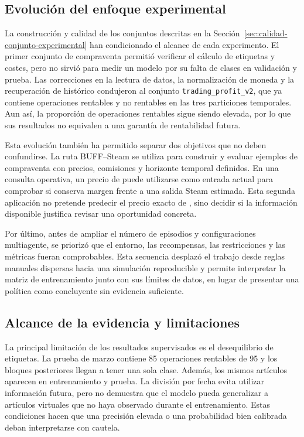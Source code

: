 \subsection{Evolución del enfoque experimental}

La construcción y calidad de los conjuntos descritas en la Sección~\ref{sec:calidad-conjunto-experimental} han condicionado el alcance de cada experimento. El primer conjunto de compraventa permitió verificar el cálculo de etiquetas y costes, pero no sirvió para medir un modelo por su falta de clases en validación y prueba. Las correcciones en la lectura de datos, la normalización de moneda y la recuperación de histórico condujeron al conjunto \texttt{trading\_profit\_v2}, que ya contiene operaciones rentables y no rentables en las tres particiones temporales. Aun así, la proporción de operaciones rentables sigue siendo elevada, por lo que sus resultados no equivalen a una garantía de rentabilidad futura.

Esta evolución también ha permitido separar dos objetivos que no deben confundirse. La ruta BUFF--Steam se utiliza para construir y evaluar ejemplos de compraventa con precios, comisiones y horizonte temporal definidos. En una consulta operativa, un precio de  puede utilizarse como entrada actual para comprobar si conserva margen frente a una salida Steam estimada. Esta segunda aplicación no pretende predecir el precio exacto de , sino decidir si la información disponible justifica revisar una oportunidad concreta.

Por último, antes de ampliar el número de episodios y configuraciones multiagente, se priorizó que el entorno, las recompensas, las restricciones y las métricas fueran comprobables. Esta secuencia desplazó el trabajo desde reglas manuales dispersas hacia una simulación reproducible y permite interpretar la matriz de entrenamiento junto con sus límites de datos, en lugar de presentar una política como concluyente sin evidencia suficiente.

\subsection{Alcance de la evidencia y limitaciones}

La principal limitación de los resultados supervisados es el desequilibrio de etiquetas. La prueba de marzo contiene 85 operaciones rentables de 95 y los bloques posteriores llegan a tener una sola clase. Además, los mismos artículos aparecen en entrenamiento y prueba. La división por fecha evita utilizar información futura, pero no demuestra que el modelo pueda generalizar a artículos virtuales que no haya observado durante el entrenamiento. Estas condiciones hacen que una precisión elevada o una probabilidad bien calibrada deban interpretarse con cautela.

